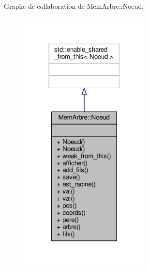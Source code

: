 Graphe de collaboration de Mem\+Arbre\+:\+:Noeud\+:\nopagebreak
\begin{figure}[H]
\begin{center}
\leavevmode
\includegraphics[width=189pt]{classMemArbre_1_1Noeud__coll__graph}
\end{center}
\end{figure}
